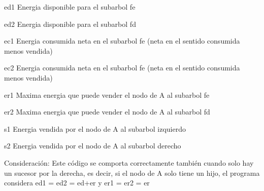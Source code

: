 \documentclass[10pt]{article}
\begin{document}
\begin{description}
\item{ed1} Energia disponible para el subarbol fe
\item{ed2} Energia disponible para el subarbol fd
\item{ec1} Energia consumida neta en el subarbol fe (neta en el sentido consumida menos vendida)
\item{ec2} Energia consumida neta en el subarbol fe (neta en el sentido consumida menos vendida)
\item{er1} Maxima energia que puede vender el nodo de A al subarbol fe
\item{er2} Maxima energia que puede vender el nodo de A al subarbol fd
\item{s1}  Energia vendida por el nodo de A al subarbol izquierdo
\item{s2}  Energia vendida por el nodo de A al subarbol derecho
\end{description}
Consideración: Este código se comporta correctamente también cuando solo hay un sucesor por la derecha, 
es decir, si el nodo de A solo tiene un hijo, el programa considera ed1 = ed2 = ed+er y er1 = er2 = er
\end{document}
